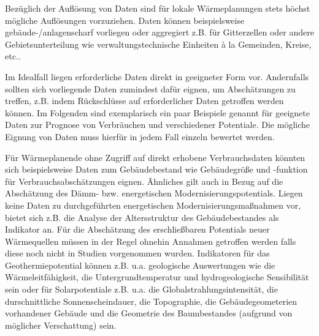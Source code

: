 			Bezüglich der Auflösung von Daten sind für lokale Wärmeplanungen stets höchst mögliche Auflösungen vorzuziehen. Daten können beispielsweise gebäude-/anlagenscharf vorliegen oder aggregiert z.B. für Gitterzellen oder andere Gebietsunterteilung wie verwaltungstechnische Einheiten à la Gemeinden, Kreise, etc.. 
				
			Im Idealfall liegen erforderliche Daten direkt in geeigneter Form vor. Andernfalls sollten sich vorliegende Daten zumindest dafür eignen, um Abschätzungen zu treffen, z.B. indem Rückschlüsse auf erforderlicher Daten getroffen werden können. Im Folgenden sind exemplarisch ein paar Beispiele genannt für geeignete Daten zur Prognose von Verbräuchen und verschiedener Potentiale. Die mögliche Eignung von Daten muss hierfür in jedem Fall einzeln bewertet werden.
			
			Für Wärmeplanende ohne Zugriff auf direkt erhobene Verbrauchsdaten könnten sich beispielsweise Daten zum Gebäudebestand wie Gebäudegröße und -funktion für Verbrauchsabschätzungen eignen. Ähnliches gilt auch in Bezug auf die Abschätzung des Dämm- bzw. energetischen Modernisierungspotentials. Liegen keine Daten zu durchgeführten energetischen Modernisierungsmaßnahmen vor, bietet sich z.B. die Analyse der Altersstruktur des Gebäudebestandes als Indikator an. Für die Abschätzung des erschließbaren Potentials neuer Wärmequellen müssen in der Regel ohnehin Annahmen getroffen werden falls diese noch nicht in Studien vorgenommen wurden. Indikatoren für das Geothermiepotential können z.B. u.a. geologische Auswertungen wie die Wärmeleitfähigkeit, die Untergrundtemperatur und hydrogeologische Sensibilität sein oder für Solarpotentiale z.B. u.a. die Globalstrahlungsintensität, die durschnittliche Sonnenscheindauer, die Topographie, die Gebäudegeometerien vorhandener Gebäude und die Geometrie des Baumbestandes (aufgrund von möglicher Verschattung) sein. 
			
			
			
			
